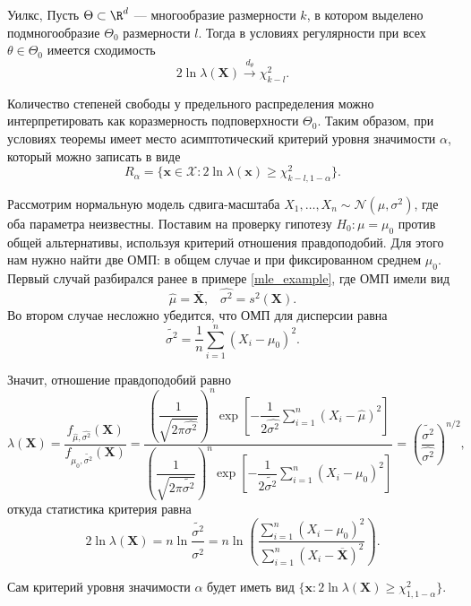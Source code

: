 \begin{theorem}{Уилкс, \cite{wilks1938large}}{}
	Пусть $\Theta \subset \R^d$ --- многообразие размерности $k$, в котором выделено подмногообразие $\Theta_0$ размерности $l$. Тогда в условиях регулярности при всех $\theta \in \Theta_0$ имеется сходимость
	$$
	2\ln{\lambda(\mathbf X)} \stackrel{d_{\theta}}{\to} \chi^2_{k-l}.
	$$
\end{theorem}

Количество степеней свободы у предельного распределения можно интерпретировать как коразмерность подповерхности $\Theta_0$. Таким образом, при условиях теоремы имеет место асимптотический критерий уровня значимости $\alpha$, который можно записать в виде
\[
R_{\alpha} = \{\mathbf x \in \mathcal{X}\colon 2\ln{\lambda(\mathbf x)} \ge \chi^2_{k-l,1-\alpha}\}.
\]

\begin{example}
	Рассмотрим нормальную модель сдвига-масштаба $X_1, \ldots, X_n \sim \mathcal N(\mu, \sigma^2)$, где оба параметра неизвестны. Поставим на проверку гипотезу $H_0\colon \mu = \mu_0$ против общей альтернативы, используя критерий отношения правдоподобий. Для этого нам нужно найти две ОМП: в общем случае и при фиксированном среднем $\mu_0$. Первый случай разбирался ранее в примере \ref{mle_example}, где ОМП имели вид
	\[
	\widehat{\mu} = \overline{\mathbf X}, \;\;\; \widehat{\sigma^2} = s^2(\mathbf X).
	\]
	Во втором случае несложно убедится, что ОМП для дисперсии равна
	\[
	\widetilde{\sigma^2} = \frac{1}{n}\sum_{i=1}^n (X_i - \mu_0)^2.
	\]
	
	Значит, отношение правдоподобий равно
	\[
	\lambda(\mathbf X) = \frac{f_{\widehat{\mu}, \widehat{\sigma^2}}(\mathbf X)}{f_{\mu_0, \widetilde{\sigma^2}}(\mathbf X)} =
	\frac{\left(\dfrac{1}{\sqrt{2\pi \widehat{\sigma^2}}}\right)^{n} \exp{\displaystyle\left[-\dfrac{1}{2\widehat{\sigma^2}} \sum\limits_{i=1}^n (X_i - \widehat\mu)^2\right]}}{\left(\dfrac{1}{\sqrt{2\pi \widetilde{\sigma^2}}}\right)^{n} \exp{\displaystyle\left[-\dfrac{1}{2\widetilde{\sigma^2}} \sum\limits_{i=1}^n (X_i - \mu_0)^2\right]}} = 
	\left(\frac{\widetilde{\sigma^2}}{\widehat{\sigma^2}}\right)^{n/2},
	\]
	откуда статистика критерия равна
	\[
	2\ln\lambda(\mathbf X) = n\ln\frac{\widetilde{\sigma^2}}{\widehat{\sigma^2}} = n\ln{\left(\frac{\sum_{i=1}^n (X_i - \mu_0)^2}{\sum_{i=1}^n (X_i - \overline{\mathbf X})^2}\right)}.
	\]
	
	Сам критерий уровня значимости $\alpha$ будет иметь вид $\{\mathbf x\colon 2\ln\lambda(\mathbf X) \ge \chi^2_{1,1-\alpha}\}$.
\end{example}

